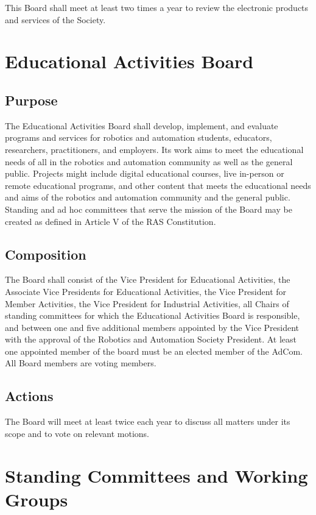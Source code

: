 \documentclass[10pt]{article}
\begin{document}
This Board shall meet at least two times a year to review the electronic products and services of the Society.


\section{Educational Activities Board}
\label{EAB}

\subsection{Purpose}
The Educational Activities Board shall develop, implement, and evaluate programs and services for robotics and automation students, educators, researchers, practitioners, and employers. Its work aims to meet the educational needs of all in the robotics and automation community as well as the general public. Projects might include digital educational courses, live in-person or remote educational programs, and other content that meets the educational needs and aims of the robotics and automation community and the general public. Standing and ad hoc committees that serve the mission of the Board may be created as defined in Article V of the RAS Constitution. 


\subsection{Composition}

The Board shall consist of the Vice President for Educational Activities, the Associate Vice Presidents for Educational Activities, the Vice President for Member Activities, the Vice President for Industrial Activities, all Chairs of standing committees for which the Educational Activities Board is responsible, and between one and five additional members appointed by the Vice President with the approval of the Robotics and Automation Society President. At least one appointed member of the board must be an elected member of the AdCom. All Board members are voting members. 

\subsection{Actions}
The Board will meet at least twice each year to discuss all matters under its scope and to vote on relevant motions.


\section{Standing Committees and Working Groups}
\label{StandingCommittees}
\end{document}
